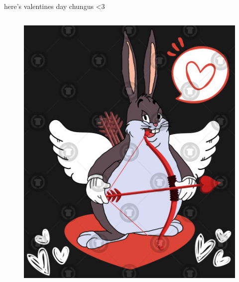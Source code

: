 \documentclass{beamer}
\begin{document}
\begin{frame}{here's valentines day chungus \textless 3}
\begin{columns}
\begin{figure}[h]
\centering
\includegraphics[scale=1]{img/chungus_wtf.jpg}


\end{figure}
\end{columns}
\end{frame}
\end{document}
